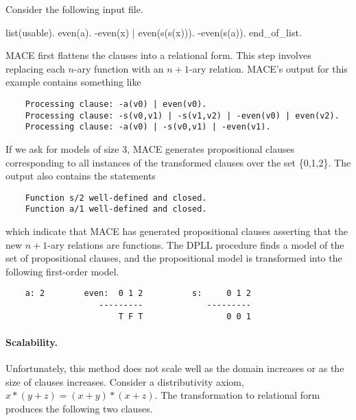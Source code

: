 \documentclass[11pt]{article}
\begin{document}
Consider the following input file.
\begin{center}
\begin{small}
\begin{boxedverbatim}
list(usable).
  even(a).
  -even(x) | even(s(s(x))).
  -even(s(a)).
end_of_list.
\end{boxedverbatim}
\end{small}
\end{center}
MACE first flattens the clauses into a relational form.
This step involves replacing each $n$-ary function with an $n+1$-ary relation.
MACE's output for this example contains something like

\begin{small}
\begin{verbatim}
    Processing clause: -a(v0) | even(v0).
    Processing clause: -s(v0,v1) | -s(v1,v2) | -even(v0) | even(v2).
    Processing clause: -a(v0) | -s(v0,v1) | -even(v1).
\end{verbatim}
\end{small}
If we ask for models of size 3, MACE generates propositional
clauses corresponding to all instances of the transformed clauses
over the set \{0,1,2\}.  The output also contains the statements

\begin{small}
\begin{verbatim}
    Function s/2 well-defined and closed.
    Function a/1 well-defined and closed.
\end{verbatim}
\end{small}
\noindent
which indicate that MACE has generated
propositional clauses asserting that the new $n+1$-ary relations
are functions.  The DPLL procedure finds a model of the
set of propositional clauses, and the propositional model
is transformed into the following first-order model.

\begin{small}
\begin{verbatim}
    a: 2        even:  0 1 2          s:     0 1 2
                   ---------             ---------
                       T F T                 0 0 1
\end{verbatim}
\end{small}

\paragraph{Scalability.}  Unfortunately, this method does not scale well
as the domain increases or as the size of clauses increases.
Consider a distributivity axiom, $x * (y + z) = (x + y) * (x + z)$.
The transformation to relational form produces the following two clauses.
\end{document}
